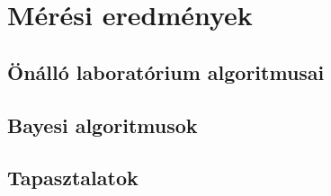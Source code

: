 \chapter{Mérési eredmények}
\label{sec:meresek}

\section{Önálló laboratórium algoritmusai}

\section{Bayesi algoritmusok}

\section{Tapasztalatok}
